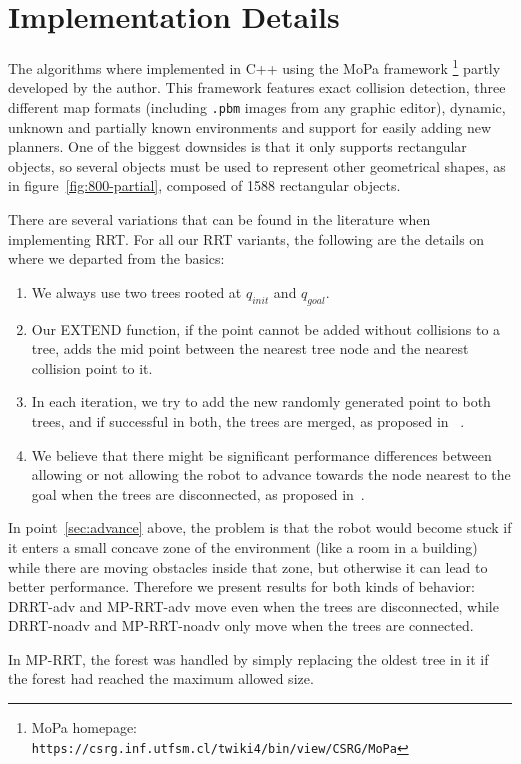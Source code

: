 \section{Implementation Details}

The algorithms where implemented in C++ using the MoPa framework%
\footnote{MoPa homepage:
\texttt{https://csrg.inf.utfsm.cl/twiki4/bin/view/CSRG/MoPa}}
 partly developed by the author. This framework features exact collision
 detection, three different map formats (including \texttt{.pbm} images from any
 graphic editor), dynamic, unknown
 and partially known environments and support for easily adding new planners.
 One of the biggest downsides is that it only supports rectangular objects, so
 several objects must be used to represent other geometrical shapes, as in
 figure~\ref{fig:800-partial}, composed of 1588 rectangular objects.

There are several variations that can be found in the literature when
implementing RRT. For all our RRT variants, the following are the details on
where we departed from the basics:
\begin{enumerate}
\item We always use two trees rooted at $q_{init}$ and $q_{goal}$.
\item Our EXTEND function, if the point cannot be added without collisions to a
tree, adds the mid point between the nearest tree node and the nearest collision
point to it.
\item In each iteration, we try to add the new randomly generated point to both
trees, and if successful in both, the trees are merged, as proposed in~%
\cite{Kuffner00}.
\item\label{sec:advance} We believe that there might be significant performance 
differences between allowing or not allowing the robot to
advance towards the node nearest to the goal when the trees are disconnected, as
proposed in~\cite{Zucker07}. 
\end{enumerate}
In point~\ref{sec:advance} above, the problem is that the robot would become stuck
if it enters a small concave zone of the environment (like a room in a building)
while there are moving obstacles inside that zone, but otherwise it can lead to
better performance. Therefore we present results for both kinds of behavior:
DRRT-adv and MP-RRT-adv move even when the trees are disconnected, while
DRRT-noadv and MP-RRT-noadv only
move when the trees are connected.

In MP-RRT, the forest was handled by simply replacing the oldest tree in it if the
forest had reached the maximum allowed size.

